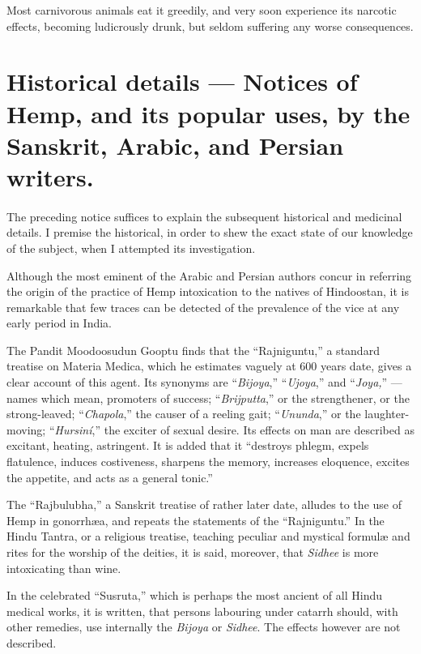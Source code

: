 \documentclass[a4paper, 11pt, oneside, polutonikogreek, english]{article}
\begin{document}
Most carnivorous animals eat it greedily, and very soon experience its narcotic effects, becoming ludicrously drunk, but seldom suffering any worse consequences.
\clearpage
\section{Historical details --- Notices of Hemp, and its popular uses, by the Sanskrit, Arabic, and Persian writers.}
\paragraph{}
The preceding notice suffices to explain the subsequent historical and medicinal details. I premise the historical, in order to shew the exact state of our knowledge of the subject, when I attempted its investigation.

Although the most eminent of the Arabic and Persian authors concur in referring the origin of the practice of Hemp intoxication to the natives of Hindoostan, it is remarkable that few traces can be detected of the prevalence of the vice at any early period in India.

The Pandit Moodoosudun Gooptu finds that the ``Rajniguntu,'' a standard treatise on Materia Medica, which he estimates vaguely at 600 years date, gives a clear account of this agent. Its synonyms are ``\emph{Bijoya},'' ``\emph{Ujoya},'' and ``\emph{Joya,}'' --- names which mean, promoters of success; ``\emph{Brijputta},'' or the strengthener, or the strong-leaved; ``\emph{Chapola},'' the causer of a reeling gait; ``\emph{Ununda},'' or the laughter-moving; ``\emph{Hursiní},'' the exciter of sexual desire. Its effects on man are described as excitant, heating, astringent. It is added that it ``destroys phlegm, expels flatulence, induces costiveness, sharpens the memory, increases eloquence, excites the appetite, and acts as a general tonic.''

The ``Rajbulubha,'' a Sanskrit treatise of rather later date, alludes to the use of Hemp in gonorrhæa, and repeats the statements of the ``Rajniguntu.'' In the Hindu Tantra, or a religious treatise, teaching peculiar and mystical formulæ and rites for the worship of the deities, it is said, moreover, that \emph{Sidhee} is more intoxicating than wine.

In the celebrated ``Susruta,'' which is perhaps the most ancient of all Hindu medical works, it is written, that persons labouring under catarrh should, with other remedies, use internally the \emph{Bijoya} or \emph{Sidhee}. The effects however are not described.
\end{document}
